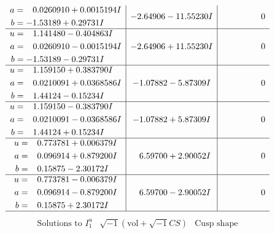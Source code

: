 \documentclass[1p]{elsarticle_modified}
\theoremstyle{definition}
\newcommand{\I}{\sqrt{-1}}
\begin{document}
$$\begin{array}{c|c|c}
\begin{aligned}
a &= \phantom{-}0.0260910 + 0.0015194 I \\
b &= -1.53189 + 0.29731 I\end{aligned}
 & -2.64906 - 11.55230 I & \phantom{-0.000000 } 0 \\ \hline\begin{aligned}
u &= \phantom{-}1.141480 - 0.404863 I \\
a &= \phantom{-}0.0260910 - 0.0015194 I \\
b &= -1.53189 - 0.29731 I\end{aligned}
 & -2.64906 + 11.55230 I & \phantom{-0.000000 } 0 \\ \hline\begin{aligned}
u &= \phantom{-}1.159150 + 0.383790 I \\
a &= \phantom{-}0.0210091 + 0.0368586 I \\
b &= \phantom{-}1.44124 - 0.15234 I\end{aligned}
 & -1.07882 - 5.87309 I & \phantom{-0.000000 } 0 \\ \hline\begin{aligned}
u &= \phantom{-}1.159150 - 0.383790 I \\
a &= \phantom{-}0.0210091 - 0.0368586 I \\
b &= \phantom{-}1.44124 + 0.15234 I\end{aligned}
 & -1.07882 + 5.87309 I & \phantom{-0.000000 } 0 \\ \hline\begin{aligned}
u &= \phantom{-}0.773781 + 0.006379 I \\
a &= \phantom{-}0.096914 + 0.879200 I \\
b &= \phantom{-}0.15875 - 2.30172 I\end{aligned}
 & \phantom{-}6.59700 + 2.90052 I & \phantom{-0.000000 } 0 \\ \hline\begin{aligned}
u &= \phantom{-}0.773781 - 0.006379 I \\
a &= \phantom{-}0.096914 - 0.879200 I \\
b &= \phantom{-}0.15875 + 2.30172 I\end{aligned}
 & \phantom{-}6.59700 - 2.90052 I & \phantom{-0.000000 } 0\\
 \hline 
 \end{array}$$\newpage$$\begin{array}{c|c|c}  
\text{Solutions to }I^u_{1}& \I (\text{vol} + \sqrt{-1}CS) & \text{Cusp shape}\\
 \hline 
\begin{aligned}

\end{aligned}
\end{array}$$
\end{document}
